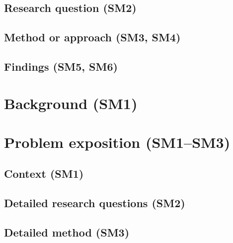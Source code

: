 \documentclass[a4paper, 11pt]{report}
\begin{document}
\section{Research question (SM2)}
\label{sec:research-question}

\section{Method or approach (SM3, SM4)}
\label{sec:method}

\section{Findings (SM5, SM6)}
\label{sec:findings}

\chapter{Background (SM1)}
\label{ch:background}

\chapter{Problem exposition (SM1--SM3)}
\label{ch:problem}

\section{Context (SM1)}
\section{Detailed research questions (SM2)}
\section{Detailed method (SM3)}
\end{document}

